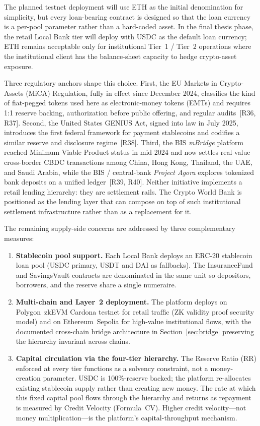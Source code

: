 \documentclass[12pt,a4paper]{report}
\begin{document}
The planned testnet deployment will use ETH as the initial denomination for simplicity, but every loan-bearing contract is designed so that the loan currency is a per-pool parameter rather than a hard-coded asset. In the final thesis phase, the retail Local Bank tier will deploy with USDC as the default loan currency; ETH remains acceptable only for institutional Tier~1 / Tier~2 operations where the institutional client has the balance-sheet capacity to hedge crypto-asset exposure.

Three regulatory anchors shape this choice. First, the EU Markets in Crypto-Assets (MiCA) Regulation, fully in effect since December 2024, classifies the kind of fiat-pegged tokens used here as electronic-money tokens (EMTs) and requires 1{:}1 reserve backing, authorization before public offering, and regular audits~[R36, R37]. Second, the United States GENIUS Act, signed into law in July 2025, introduces the first federal framework for payment stablecoins and codifies a similar reserve and disclosure regime~[R38]. Third, the BIS \textit{mBridge} platform reached Minimum Viable Product status in mid-2024 and now settles real-value cross-border CBDC transactions among China, Hong Kong, Thailand, the UAE, and Saudi Arabia, while the BIS / central-bank \textit{Project Agora} explores tokenized bank deposits on a unified ledger~[R39, R40]. Neither initiative implements a retail lending hierarchy: they are settlement rails. The Crypto World Bank is positioned as the lending layer that can compose on top of such institutional settlement infrastructure rather than as a replacement for it.

The remaining supply-side concerns are addressed by three complementary measures:

\begin{enumerate}[noitemsep]
\item \textbf{Stablecoin pool support.} Each Local Bank deploys an ERC-20 stablecoin loan pool (USDC primary, USDT and DAI as fallbacks). The InsuranceFund and SavingsVault contracts are denominated in the same unit so depositors, borrowers, and the reserve share a single numeraire.
\item \textbf{Multi-chain and Layer~2 deployment.} The platform deploys on Polygon~zkEVM Cardona testnet for retail traffic (ZK validity proof security model) and on Ethereum~Sepolia for high-value institutional flows, with the documented cross-chain bridge architecture in Section~\ref{sec:bridge} preserving the hierarchy invariant across chains.
\item \textbf{Capital circulation via the four-tier hierarchy.} The Reserve Ratio (RR) enforced at every tier functions as a solvency constraint, not a money-creation parameter. USDC is 100\%-reserve backed; the platform re-allocates existing stablecoin supply rather than creating new money. The rate at which this fixed capital pool flows through the hierarchy and returns as repayment is measured by Credit Velocity (Formula~CV). Higher credit velocity---not money multiplication---is the platform's capital-throughput mechanism.
\end{enumerate}
\end{document}
